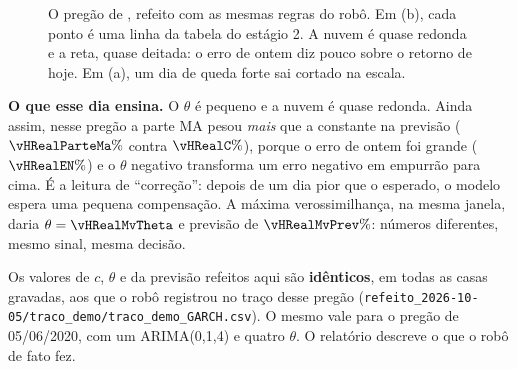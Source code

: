 \documentclass[11pt,a4paper]{article}
\newcommand{\arq}[1]{../../../dados/resultados/hannan_rissanen_2026-10-30/#1}
\begin{document}
\begin{figure}[htbp]\centering
{}
\caption{O pregão de \vHDiaReal, refeito com as mesmas regras do robô. Em (b), cada ponto é uma linha da tabela do
estágio 2. A nuvem é quase redonda e a reta, quase deitada: o erro de ontem diz pouco sobre o retorno de hoje. Em (a),
um dia de queda forte sai cortado na escala.}
\label{fig:real}
\end{figure}

\textbf{O que esse dia ensina.} O $\theta$ é pequeno e a nuvem é quase redonda. Ainda assim, nesse pregão a parte MA
pesou \emph{mais} que a constante na previsão ($\vHRealParteMa\%$ contra $\vHRealC\%$), porque o erro de ontem foi grande
($\vHRealEN\%$) e o $\theta$ negativo transforma um erro negativo em empurrão para cima. É a leitura de ``correção'':
depois de um dia pior que o esperado, o modelo espera uma pequena compensação. A máxima verossimilhança, na mesma
janela, daria $\theta = \vHRealMvTheta$ e previsão de $\vHRealMvPrev\%$: números diferentes, mesmo sinal, mesma decisão.

\begin{ideia}[Conferência]
Os valores de $c$, $\theta$ e da previsão refeitos aqui são \textbf{idênticos}, em todas as casas gravadas, aos que o
robô registrou no traço desse pregão (\texttt{refeito\_2026-10-05/traco\_demo/traco\_demo\_GARCH.csv}). O mesmo vale
para o pregão de 05/06/2020, com um ARIMA(0,1,4) e quatro $\theta$. O relatório descreve o que o robô de fato fez.
\end{ideia}
\end{document}
